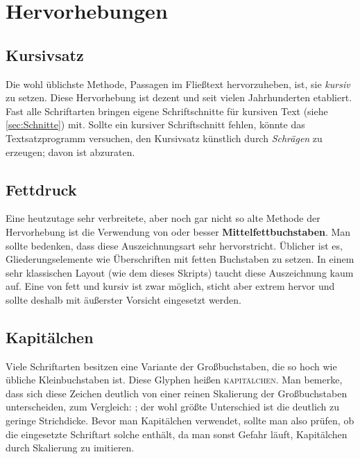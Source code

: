 \chapter{Hervorhebungen}

\lipsum[1]

\section{Kursivsatz}

Die wohl üblichste Methode, Passagen im Fließtext hervorzuheben, ist, sie
\emph{kursiv} zu setzen. Diese Hervorhebung ist dezent und seit vielen
Jahrhunderten etabliert. Fast alle Schriftarten bringen eigene Schriftschnitte
für kursiven Text (siehe \cref{sec:Schnitte}) mit. Sollte ein kursiver
Schriftschnitt fehlen, könnte das Textsatzprogramm versuchen, den Kursivsatz
künstlich durch \textsl{Schrägen} zu erzeugen; davon ist abzuraten.

\section{Fettdruck}

Eine heutzutage sehr verbreitete, aber noch gar nicht so alte Methode der
Hervorhebung ist die Verwendung von {\selectfont {Fett-}} oder
besser \textbf{Mittelfettbuchstaben}. Man sollte bedenken, dass diese
Auszeichnungsart sehr hervorstricht. Üblicher ist es, Gliederungselemente wie
Überschriften mit fetten Buchstaben zu setzen. In einem sehr klassischen Layout
(wie dem dieses Skripts) taucht diese Auszeichnung kaum auf. Eine
\emph{{\selectfont{Kombination}}} von fett und kursiv ist zwar
möglich, sticht aber extrem hervor und sollte deshalb mit äußerster Vorsicht
eingesetzt werden.

\section{Kapitälchen}

Viele Schriftarten besitzen eine Variante der Großbuchstaben, die so hoch wie
übliche Kleinbuchstaben ist. Diese Glyphen heißen \textsc{kapitälchen}. Man
bemerke, dass sich diese Zeichen deutlich von einer reinen Skalierung der
Großbuchstaben unterscheiden, zum Vergleich: ; der
wohl größte Unterschied ist die deutlich zu geringe Strichdicke. Bevor man
Kapitälchen verwendet, sollte man also prüfen, ob die eingesetzte Schriftart
solche enthält, da man sonst Gefahr läuft, Kapitälchen durch Skalierung zu
imitieren.

